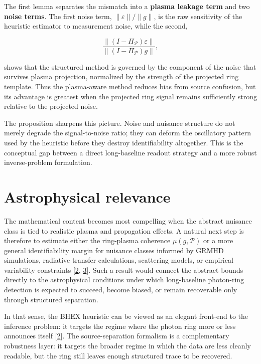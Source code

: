 \documentclass[10pt,letterpaper,twocolumn]{article}
\begin{document}
The first lemma separates the mismatch into a \textbf{plasma leakage
term} and two \textbf{noise terms}. The first noise term,
\(\|\varepsilon\|/\|g\|\), is the raw sensitivity of the heuristic
estimator to measurement noise, while the second,

\[
\frac{\|(I-\Pi_{\mathcal P})\varepsilon\|}{\|(I-\Pi_{\mathcal P})g\|},
\]

shows that the structured method is governed by the component of the
noise that survives plasma projection, normalized by the strength of the
projected ring template. Thus the plasma-aware method reduces bias from
source confusion, but its advantage is greatest when the projected ring
signal remains sufficiently strong relative to the projected noise.

The proposition sharpens this picture. Noise and nuisance structure do
not merely degrade the signal-to-noise ratio; they can deform the
oscillatory pattern used by the heuristic before they destroy
identifiability altogether. This is the conceptual gap between a direct
long-baseline readout strategy and a more robust inverse-problem
formulation.

\hypertarget{astrophysical-relevance}{%
\section{Astrophysical relevance}\label{astrophysical-relevance}}

The mathematical content becomes most compelling when the abstract
nuisance class is tied to realistic plasma and propagation effects. A
natural next step is therefore to estimate either the ring-plasma
coherence \(\mu(g,\mathcal P)\) or a more general identifiability margin
for nuisance classes informed by GRMHD simulations, radiative transfer
calculations, scattering models, or empirical variability constraints
[\hyperlink{ref-2}{2}, \hyperlink{ref-3}{3}]. Such a result would
connect the abstract bounds directly to the astrophysical conditions
under which long-baseline photon-ring detection is expected to succeed,
become biased, or remain recoverable only through structured separation.

In that sense, the BHEX heuristic can be viewed as an elegant front-end
to the inference problem: it targets the regime where the photon ring
more or less announces itself [\hyperlink{ref-2}{2}]. The
source-separation formalism is a complementary robustness layer: it
targets the broader regime in which the data are less cleanly readable,
but the ring still leaves enough structured trace to be recovered.
\end{document}
